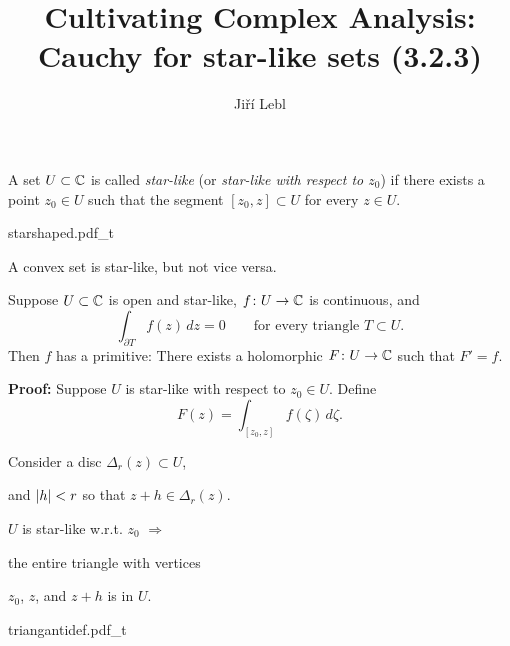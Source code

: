 \documentclass[10pt,aspectratio=169]{beamer}
\author{Ji\v{r}\'i Lebl}
\institute[OSU]{%
Departemento pri Matematiko de Oklahoma {\^S}tata Universitato}
\title{Cultivating Complex Analysis:\\%
Cauchy for star-like sets (3.2.3)}
\date{}
\begin{document}
\begin{frame}
\titlepage
\end{frame}
\begin{frame}
\begin{definition}
A set $U \subset {\mathbb{C}}$ is called \emph{{star-like}} (or
\emph{star-like with respect to $z_0$}) if there exists a
point $z_0 \in U$ such that the segment $[z_0,z] \subset U$ for every
$z \in U$.
\end{definition}

\medskip
\pause

\begin{center}
{starshaped.pdf_t}
\end{center}

\medskip
\pause

A convex set is star-like, but not vice versa.

\end{frame}

\begin{frame}

\begin{proposition} \label{prop:primitiveinstarlike1}
Suppose $U \subset {\mathbb{C}}$ is open and star-like,
$f \colon U \to {\mathbb{C}}$ is continuous, and
\begin{equation*}
\int_{\partial T} f(z) \, dz = 0
\qquad \text{for every triangle $T \subset U$.}
\end{equation*}
Then $f$ has a primitive:
There exists a holomorphic $F \colon U \to {\mathbb{C}}$
such that $F' = f$.
\end{proposition}

\pause

\textbf{Proof:}
Suppose $U$ is star-like with respect to $z_0 \in U$.
\pause
Define
\begin{equation*}
F(z) = \int_{[z_0,z]} f(\zeta) \, d\zeta .
\end{equation*}
\pause

\vspace*{-0.2in}
Consider a disc $\Delta_r(z) \subset U$,

and $\lvert {h} \rvert < r$ so that $z+h \in \Delta_r(z)$.

\pause
\medskip

$U$ is star-like w.r.t. $z_0$ $\Rightarrow$

the entire triangle with vertices

$z_0$, $z$, and $z+h$ is in $U$.

\vspace*{-1.2in}

\hspace*{2.2in}%
{triangantidef.pdf_t}
\end{frame}
\end{document}

